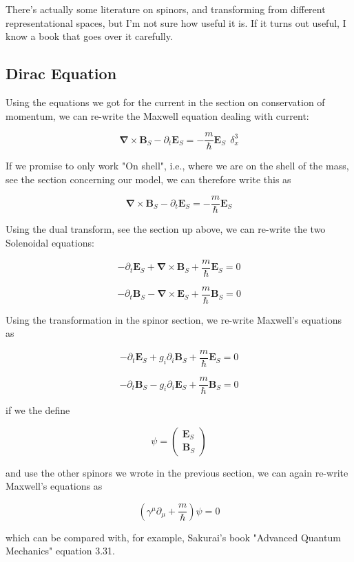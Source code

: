 \documentclass {article}
\renewcommand\vec{\mathbf}
\let\OldS\nabla
\renewcommand{\nabla}{\boldsymbol{\OldS}}
\begin{document}
There's actually some literature on spinors, and transforming from different representational spaces, but I'm not sure how useful it is. If it turns out useful, I know a book that goes over it carefully. 

\newpage

\subsection{Dirac Equation}



Using the equations we got for the current in the section on conservation of momentum, we can re-write the Maxwell equation dealing with current:

$$\nabla \times \vec B_S  - \partial_t \vec E_S  = - \frac m {\hbar} \vec E_S ~~ \delta^3_x$$

If we promise to only work "On shell", i.e., where we are on the shell of the mass, see the section concerning our model, we can therefore write this as

$$\nabla \times \vec B_S  - \partial_t \vec E_S  = - \frac m {\hbar} \vec E_S $$

Using the dual transform, see the section up above, we can re-write the two Solenoidal equations:

$$-\partial_t \vec E_S + \nabla \times \vec B_S   +\frac m {\hbar} \vec E_S = 0 $$ 

$$ -\partial_t \vec B_S - \nabla \times \vec E_S   +\frac m {\hbar} \vec B_S = 0$$ 


Using the transformation in the spinor section, we  re-write Maxwell's equations as 

$$-\partial_t \vec E_S + g_i \partial_i \vec B_S   +\frac m {\hbar} \vec E_S = 0 $$ 

$$ -\partial_t \vec B_S - g_i \partial_i \vec E_S   +\frac m {\hbar} \vec B_S = 0 $$ 


if we the define 

$$\psi = \left(\begin{matrix}  \vec E_S \\ \vec B_S \end{matrix}\right) $$

and use the other spinors we wrote in the previous section, we can again re-write Maxwell's equations as

$$\left(\gamma^{\mu} \partial_{\mu} + \frac m {\hbar} \right) \psi = 0 $$

which can be compared with, for example, Sakurai's book "Advanced Quantum Mechanics" equation 3.31.
\end{document}
